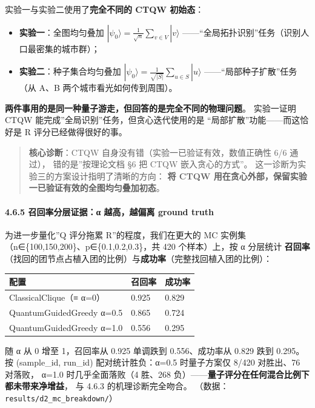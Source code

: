 \documentclass[
  11pt,
]{ctexart}
\newcounter{none} %
\providecommand{\tightlist}{%
  \setlength{\itemsep}{0pt}\setlength{\parskip}{0pt}}
\begin{document}
实验一与实验二使用了\textbf{完全不同的 CTQW 初始态}：

\begin{itemize}
\tightlist
\item
  \textbf{实验一}：全图均匀叠加
  \(|\psi_0\rangle = \frac{1}{\sqrt{n}} \sum_{v \in V} |v\rangle\)
  ------``全局拓扑识别''任务（识别人口最密集的城市群）；
\item
  \textbf{实验二}：种子集合均匀叠加
  \(|\psi_0\rangle = \frac{1}{\sqrt{|S|}} \sum_{u \in S} |u\rangle\)
  ------``局部种子扩散''任务（从 A、B 两个城市看光如何传到周围）。
\end{itemize}

\textbf{两件事用的是同一种量子游走，但回答的是完全不同的物理问题}。
实验一证明 CTQW 能完成''全局识别''任务，但贪心迭代使用的是
``局部扩散''功能------而这恰好是 R 评分已经做得很好的事。

\begin{quote}
\textbf{核心诊断}：CTQW 自身没有错（实验一已验证有效，数值正确性 6/6
通过）， 错的是''按理论文档 §6 把 CTQW 嵌入贪心的方式''。
这一诊断为实验三的方案设计指明了清晰的方向： \textbf{将 CTQW
用在贪心外部，保留实验一已验证有效的全图均匀叠加初态}。
\end{quote}

\paragraph{4.6.5 召回率分层证据：α 越高，越偏离 ground
truth}\label{ux53ecux56deux7387ux5206ux5c42ux8bc1ux636eux3b1-ux8d8aux9ad8ux8d8aux504fux79bb-ground-truth}

为进一步量化''Q 评分拖累 R''的程度，我们在更大的 MC 实例集
（n∈\{100,150,200\}、p∈\{0.1,0.2,0.3\}，共 420 个样本）上，按 α 分层统计
\textbf{召回率}（找回的团节点占植入团的比例）与\textbf{成功率}（完整找回植入团的比例）：

{\def\LTcaptype{none} %
\begin{longtable}[]{@{}lll@{}}
\toprule\noalign{}
配置 & 召回率 & 成功率 \\
\midrule\noalign{}
\endhead
\bottomrule\noalign{}
\endlastfoot
ClassicalClique（≡ α=0） & 0.925 & 0.829 \\
QuantumGuidedGreedy α=0.5 & 0.865 & 0.724 \\
QuantumGuidedGreedy α=1.0 & 0.556 & 0.295 \\
\end{longtable}
}

随 α 从 0 增至 1，召回率从 0.925 单调跌到 0.556、成功率从 0.829 跌到
0.295。 按 (sample\_id, run\_id) 配对统计胜负：α=0.5 时量子方案仅 8/420
对胜出、76 对落败， α=1.0 时几乎全面落败（4 胜、268
负）------\textbf{量子评分在任何混合比例下都未带来净增益}， 与 4.6.3
的机理诊断完全吻合。 （数据：\texttt{results/d2\_mc\_breakdown/}）
\end{document}
